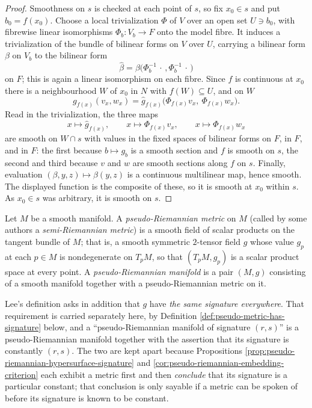 \begin{proof}
\leanok
{}
Smoothness on $s$ is checked at each point of $s$, so fix $x_0 \in s$ and put $b_0 = f(x_0)$. Choose a local trivialization $\Phi$ of $V$ over an open set $U \ni b_0$, with fibrewise linear isomorphisms $\Phi_b : V_b \to F$ onto the model fibre. It induces a trivialization of the bundle of bilinear forms on $V$ over $U$, carrying a bilinear form $\beta$ on $V_b$ to the bilinear form
\[
\hat\beta = \beta\bigl(\Phi_b^{-1}\,\cdot\,, \Phi_b^{-1}\,\cdot\,\bigr)
\]
on $F$; this is again a linear isomorphism on each fibre. Since $f$ is continuous at $x_0$ there is a neighbourhood $W$ of $x_0$ in $N$ with $f(W) \subseteq U$, and on $W$
\[
g_{f(x)}(v_x,w_x) = \hat g_{f(x)}\bigl(\Phi_{f(x)}v_x,\ \Phi_{f(x)}w_x\bigr).
\]
Read in the trivialization, the three maps
\[
x \mapsto \hat g_{f(x)}, \qquad x \mapsto \Phi_{f(x)}v_x, \qquad x \mapsto \Phi_{f(x)}w_x
\]
are smooth on $W \cap s$ with values in the fixed spaces of bilinear forms on $F$, in $F$, and in $F$: the first because $b \mapsto g_b$ is a smooth section and $f$ is smooth on $s$, the second and third because $v$ and $w$ are smooth sections along $f$ on $s$. Finally, evaluation $(\beta, y, z) \mapsto \beta(y,z)$ is a continuous multilinear map, hence smooth. The displayed function is the composite of these, so it is smooth at $x_0$ within $s$. As $x_0 \in s$ was arbitrary, it is smooth on $s$.
\end{proof}

\begin{definition}
\label{def:pseudo-riemannian-metric}
\leanok
{}
Let $M$ be a smooth manifold. A \emph{pseudo-Riemannian metric} on $M$ (called by some authors a \emph{semi-Riemannian metric}) is a smooth field of scalar products on the tangent bundle of $M$; that is, a smooth symmetric $2$-tensor field $g$ whose value $g_p$ at each $p \in M$ is nondegenerate on $T_pM$, so that $(T_pM, g_p)$ is a scalar product space at every point. A \emph{pseudo-Riemannian manifold} is a pair $(M,g)$ consisting of a smooth manifold together with a pseudo-Riemannian metric on it.
\end{definition}

Lee's definition asks in addition that $g$ have \emph{the same signature everywhere}. That requirement is carried separately here, by Definition \ref{def:pseudo-metric-has-signature} below, and a ``pseudo-Riemannian manifold of signature $(r,s)$'' is a pseudo-Riemannian manifold together with the assertion that its signature is constantly $(r,s)$. The two are kept apart because Propositions \ref{prop:pseudo-riemannian-hypersurface-signature} and \ref{cor:pseudo-riemannian-embedding-criterion} each exhibit a metric first and then \emph{conclude} that its signature is a particular constant; that conclusion is only sayable if a metric can be spoken of before its signature is known to be constant.

